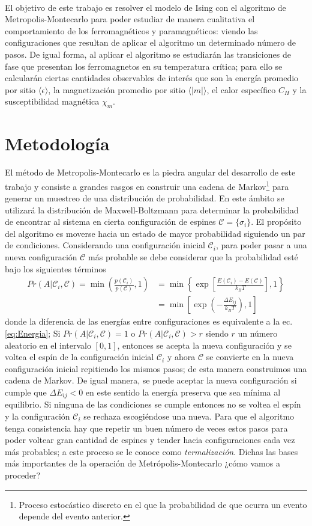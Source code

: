 \documentclass[11pt,a4paper]{article}
\newcommand{\C}{\mathscr{C}}
\begin{document}
\\
El objetivo de este trabajo es resolver el modelo de Ising con el algoritmo de Metropolis-Montecarlo para poder estudiar de manera cualitativa el comportamiento de los ferromagnéticos y paramagnéticos: viendo las configuraciones que resultan de aplicar el algoritmo un determinado número de pasos. De igual forma, al aplicar el algoritmo se estudiarán las transiciones de fase que presentan los ferromagnetos en su temperatura crítica; para ello se calcularán ciertas cantidades observables de interés que son la energía promedio por sitio $\langle\epsilon\rangle$, la magnetización promedio por sitio $\langle|m|\rangle$, el calor específico $C_H$ y la susceptibilidad magnética $\chi_m$.
\newpage
\section{Metodología}\label{Metodologia}

El método de Metropolis-Montecarlo es la piedra angular del desarrollo de este trabajo y consiste a grandes rasgos en construir una cadena de Markov\footnote{Proceso estocástico discreto en el que la probabilidad de que ocurra un evento depende del evento anterior.} para generar un muestreo de una distribución de probabilidad. En este ámbito se utilizará la distribución de Maxwell-Boltzmann para determinar la probabilidad de encontrar al sistema en cierta configuración de espines $\mathscr{C}=\{\sigma_i\}$. El propósito del algoritmo es moverse hacia un estado de mayor probabilidad siguiendo un par de condiciones. Considerando una configuración inicial $\mathscr{C}_i$, para poder pasar a una nueva configuración $\C$ más probable se debe considerar que la probabilidad esté bajo los siguientes términos
\begin{align*}
Pr(A|\mathscr{C}_i,\mathscr{C})=\min\left(\frac{p(\mathscr{C}_i)}{p(\mathscr{C})},1\right )&=\min\left\{\exp\left[\frac{E(\mathscr{C}_i)-E(\mathscr{C})}{k_BT}\right],1\right\}\\
&=\min\left[\exp\left(-\frac{\Delta E_{ij}}{k_BT}\right),1\right]
\end{align*}
donde la diferencia de las energías entre configuraciones es equivalente a la ec. \ref{eq:Energia}; Si $Pr(A|\mathscr{C}_i,\mathscr{C})=1$ o $Pr(A|\mathscr{C}_i,\mathscr{C})>r$ siendo $r$ un número aleatorio en el intervalo $[0,1]$, entonces se acepta la nueva configuración y se voltea el espín de la configuración inicial $\C_i$ y ahora $\C$ se convierte en la nueva configuración inicial repitiendo los mismos pasos; de esta manera construimos una cadena de Markov. De igual manera, se puede aceptar la nueva configuración si cumple que $\Delta E_{ij}<0$ en este sentido la energía preserva que sea mínima al equilibrio. Si ninguna de las condiciones se cumple entonces no se voltea el espín y  la configuración $\C_i$ se rechaza escogiéndose una  nueva. Para que el algoritmo tenga consistencia hay que repetir un buen número de veces estos pasos para poder voltear gran cantidad de espines y tender hacia configuraciones cada vez más probables; a este proceso se le conoce como \textit{termalización}. Dichas las bases más importantes de la operación de Metrópolis-Montecarlo ¿cómo vamos a proceder?
\end{document}
